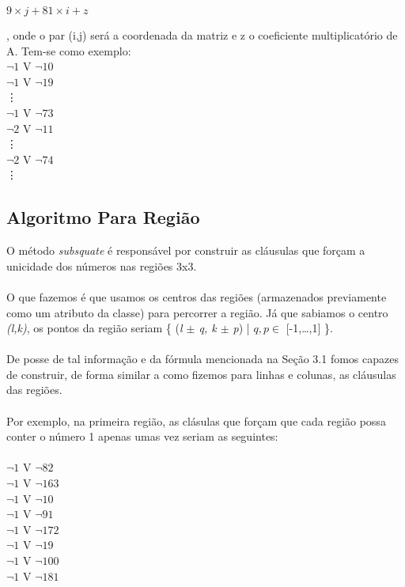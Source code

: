 \documentclass[a4paper]{article}
\begin{document}
\begin{center}
$9\times j + 81\times i + z$\\
\end{center}, onde o par (i,j) será a coordenada da matriz e z o coeficiente multiplicatório de A. Tem-se como exemplo:\\
$\neg 1$  V  $\neg 10$\\
$\neg 1$  V  $\neg 19$\\
\vdots \\
$\neg 1$  V  $\neg 73$\\
$\neg 2$  V  $\neg 11$\\
\vdots\\
$\neg 2$  V  $\neg 74$\\
\vdots


\subsection{Algoritmo Para Região}
O método \textit{subsquate} é responsável por construir as cláusulas que forçam a unicidade dos números nas regiões 3x3.\\\\
O que fazemos é que usamos os centros das regiões (armazenados previamente como um atributo da classe) para percorrer a região. Já que sabiamos o centro \textit{(l,k)}, os pontos da região seriam \{ (\textit{l $\pm$ q, k $\pm$ p}) | $q, p \in$ [-1,\dots,1] \}.\\\\
De posse de tal informação e da fórmula mencionada na Seção 3.1 fomos capazes de construir, de forma similar a como fizemos para linhas e colunas, as cláusulas das regiões.\\\\
Por exemplo, na primeira região, as clásulas que forçam que cada região possa conter o número 1 apenas umas vez seriam as seguintes:\\\\
$\neg 1$  V  $\neg 82$\\
$\neg 1$  V  $\neg 163$\\
$\neg 1$  V  $\neg 10$\\
$\neg 1$  V  $\neg 91$\\
$\neg 1$  V  $\neg 172$\\
$\neg 1$  V  $\neg 19$\\
$\neg 1$  V  $\neg 100$\\
$\neg 1$  V  $\neg 181$\\
\end{document}
